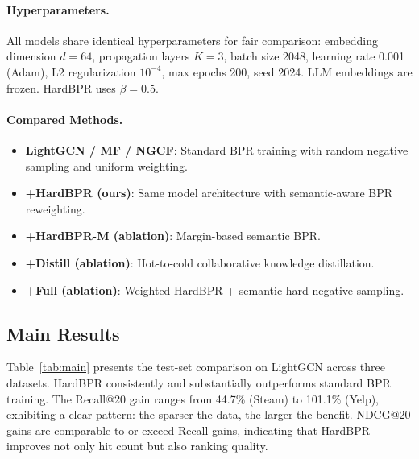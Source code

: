 \documentclass[11pt,a4paper]{article}
\begin{document}
\paragraph{Hyperparameters.} All models share identical hyperparameters for fair comparison: embedding dimension $d = 64$, propagation layers $K = 3$, batch size 2048, learning rate 0.001 (Adam), L2 regularization $10^{-4}$, max epochs 200, seed 2024. LLM embeddings are frozen. HardBPR uses $\beta = 0.5$.

\paragraph{Compared Methods.}
\begin{itemize}
    \item \textbf{LightGCN / MF / NGCF}: Standard BPR training with random negative sampling and uniform weighting.
    \item \textbf{+HardBPR (ours)}: Same model architecture with semantic-aware BPR reweighting.
    \item \textbf{+HardBPR-M (ablation)}: Margin-based semantic BPR.
    \item \textbf{+Distill (ablation)}: Hot-to-cold collaborative knowledge distillation.
    \item \textbf{+Full (ablation)}: Weighted HardBPR + semantic hard negative sampling.
\end{itemize}

\subsection{Main Results}

Table~\ref{tab:main} presents the test-set comparison on LightGCN across three datasets. HardBPR consistently and substantially outperforms standard BPR training. The Recall@20 gain ranges from 44.7\% (Steam) to 101.1\% (Yelp), exhibiting a clear pattern: the sparser the data, the larger the benefit. NDCG@20 gains are comparable to or exceed Recall gains, indicating that HardBPR improves not only hit count but also ranking quality.
\end{document}
